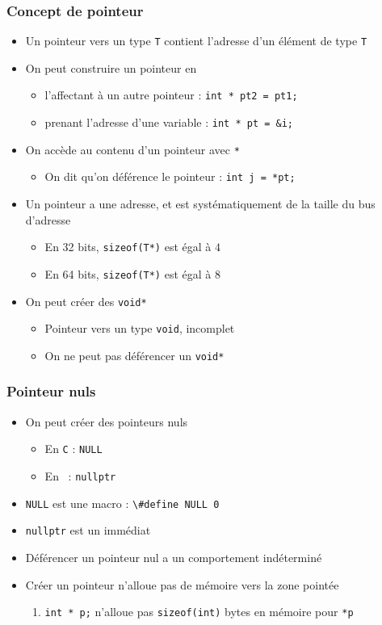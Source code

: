 \begin{frame}
\frametitle{Concept de pointeur}
\begin{itemize}[<+->]
\item Un pointeur vers un type \texttt{T} contient l'adresse d'un élément de type \texttt{T}
\item On peut construire un pointeur en
	\begin{itemize}
	\item l'affectant à un autre pointeur : \lstinline|int * pt2 = pt1;|
	\item prenant l'adresse d'une variable : \lstinline|int * pt = &i;|
	\end{itemize}
\item On accède au contenu d'un pointeur avec \texttt{*}
	\begin{itemize}
	\item On dit qu'on déférence le pointeur : \lstinline|int j = *pt;|
	\end{itemize}
\item Un pointeur a une adresse, et est systématiquement de la taille du bus d'adresse
	\begin{itemize}
	\item En 32 bits, \lstinline|sizeof(T*)| est égal à $4$
	\item En 64 bits, \lstinline|sizeof(T*)| est égal à $8$
	\end{itemize}
\item On peut créer des \lstinline|void*|
	\begin{itemize}
	\item Pointeur vers un type \lstinline|void|, incomplet	
	\item On ne peut pas déférencer un \lstinline|void*|
	\end{itemize}
\end{itemize}
\end{frame}

\begin{frame}
\frametitle{Pointeur nuls}
\begin{itemize}[<+->]
\item On peut créer des pointeurs nuls
	\begin{itemize}
	\item En \texttt{C} : \lstinline|NULL|
	\item En \cpp\ : \lstinline|nullptr|
	\end{itemize}
\item \lstinline|NULL| est une macro : \lstinline|\#define NULL 0|
\item \lstinline|nullptr| est un immédiat
\item Déférencer un pointeur nul a un comportement indéterminé
\item Créer un pointeur n'alloue pas de mémoire vers la zone pointée
	\begin{enumerate}
	\item \lstinline|int * p;| n'alloue pas \lstinline|sizeof(int)| bytes en mémoire pour \texttt{*p}
	\end{enumerate}
\end{itemize}
\end{frame}

